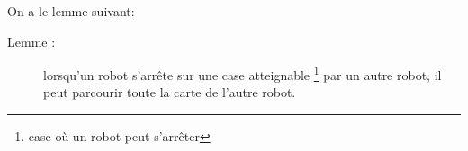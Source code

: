 \documentclass[a4paper,11pt]{article}
\begin{document}
On a le lemme suivant:\\
\begin{description}
  \item[Lemme : ] lorsqu'un robot s'arrête sur une case atteignable \footnote{case où un robot peut s'arrêter} par un autre robot, il peut parcourir toute la carte de l'autre robot.
\end{description}
\end{document}
